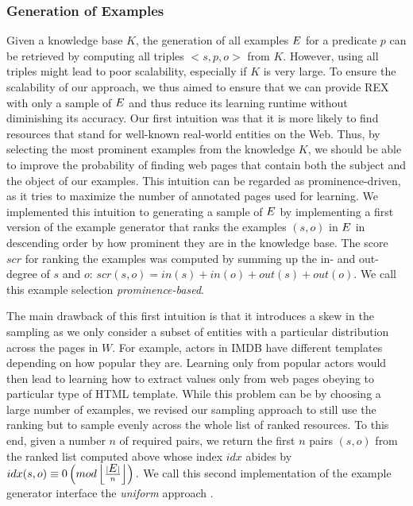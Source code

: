 \subsubsection{Generation of Examples}
Given a knowledge base $K$, the generation of all examples $\mbox{\ensuremath{E}}$ for a predicate $p$ can be retrieved by computing all triples $<s,p,o>$ from $K$.
However, using all triples might lead to poor scalability, especially if $K$ is very large.
To ensure the scalability of our approach, we thus aimed to ensure that we can provide REX with only a sample of $\mbox{\ensuremath{E}}$ and thus reduce its learning runtime without diminishing its accuracy.  
Our first intuition was that it is more likely to find resources that stand for well-known real-world entities on the Web. 
Thus, by selecting the most prominent examples from the knowledge $K$, we should be able to improve the probability of finding web pages that contain both the subject and the object of our examples. 
This intuition can be regarded as prominence-driven, as it tries to maximize the number of annotated pages used for learning. 
We implemented this intuition to generating a sample of $\mbox{\ensuremath{E}}$ by implementing a first version of the example generator that ranks the examples $(s, o)$ in $\mbox{\ensuremath{E}}$ in descending order by how prominent they are in the knowledge base. The score $scr$ for ranking the examples was computed by summing up the in- and out-degree of $s$ and $o$:
$scr(s, o) = in(s) + in(o) + out(s) + out(o)$. 
We call this example selection \emph{prominence-based}.

The main drawback of this first intuition is that it introduces a skew in the sampling as we only consider a subset of entities with a particular distribution across the pages in $W$. 
For example, actors in IMDB have different templates depending on how popular they are. 
Learning only from popular actors would then lead to learning how to extract values only from web pages obeying to particular type of HTML template. 
While this problem can be by choosing a large number of examples, we revised our sampling approach to still use the ranking but to sample evenly across the whole list of ranked resources. 
To this end, given a number $n$ of required pairs, we return the first $n$ pairs $(s,o)$ from the ranked list computed above whose index $idx$ abides by
$idx(s, o) \equiv 0  \left(mod\left \lfloor{\frac{|\mbox{\ensuremath{E}}|}{n}}\right \rfloor \right).$
We call this second implementation of the example generator interface the \emph{uniform} approach .

